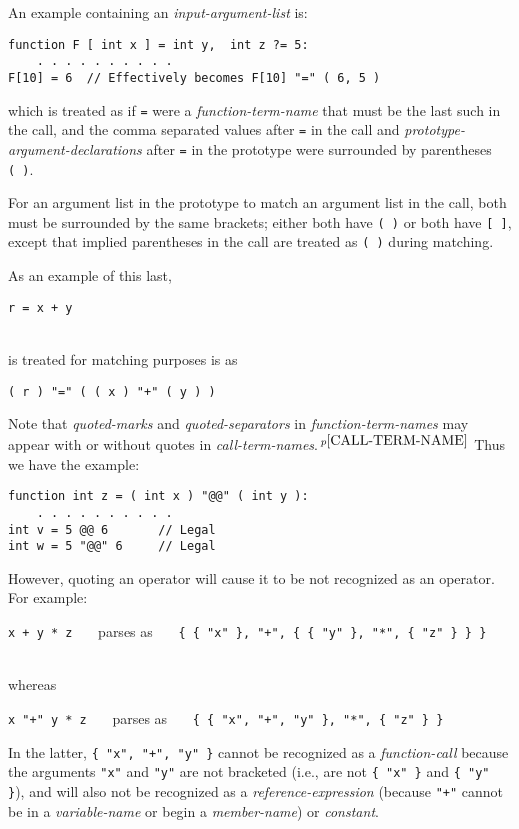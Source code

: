 \documentclass[12pt]{article}
\newcommand{\pagnote}[1]{$\,^{p\pageref{#1}}$}
\newenvironment{indpar}[1][0.3in]%
	{\begin{list}{}%
		     {\setlength{\itemsep}{0in}%
		      \setlength{\topsep}{0in}%
		      \setlength{\parsep}{1ex}%
		      \setlength{\labelwidth}{#1}%
		      \setlength{\leftmargin}{#1}%
		      \addtolength{\leftmargin}{\labelsep}}%
	 \item}%
	{\end{list}}
\begin{document}
An example containing an {\em input-argument-list} is:
\begin{indpar}\begin{verbatim}
function F [ int x ] = int y,  int z ?= 5:
    . . . . . . . . . .
F[10] = 6  // Effectively becomes F[10] "=" ( 6, 5 )
\end{verbatim}\end{indpar}
which is treated as if {\tt =} were a {\em function-term-name}
that must be the last such in the call, and the comma separated
values after {\tt =}
in the call and {\em prototype-argument-declarations} after {\tt =}
in the prototype
were surrounded by parentheses {\tt (~)}.

For an argument
list in the prototype to match an argument list in the call, both
must be surrounded by the same brackets; either both have {\tt (~)}
or both have {\tt [~]}, except that implied parentheses in the
call are treated as {\tt (~)} during matching.

As an example of this last,
\\[0.5ex]
\centerline{
{\tt r = x + y}
}
\\
is treated for matching purposes is as
\\[1ex]
\centerline{
{\tt ( r ) "=" ( ( x ) "+" ( y ) )}
}

Note that {\em quoted-marks} and {\em quoted-separators}
in {\em function-term-names} may appear with or without quotes in
{\em call-term-names}.\pagnote{CALL-TERM-NAME}  Thus we have the example:
\begin{indpar}\begin{verbatim}
function int z = ( int x ) "@@" ( int y ):
    . . . . . . . . . .
int v = 5 @@ 6       // Legal
int w = 5 "@@" 6     // Legal
\end{verbatim}\end{indpar}

However, quoting an operator will cause it to be not recognized as
an operator.  For example:
\\[0.5ex]
\centerline{
{\tt x + y * z}
~~~parses as~~~
{\tt \{ \{ "x" \}, "+", \{ \{ "y" \}, "*", \{ "z" \} \} \}} \\
} \\
whereas \\
\centerline{
{\tt x "+" y * z}
~~~parses as~~~
{\tt \{ \{ "x", "+", "y" \}, "*", \{ "z" \} \}}
}
In the latter, {\tt \{ "x", "+", "y" \}} cannot be recognized as
a {\em function-call} because the arguments {\tt "x"} and {\tt "y"} are
not bracketed (i.e., are not {\tt \{ "x" \}} and {\tt \{ "y" \}}),
and will also not be recognized as a {\em reference-expression}
(because {\tt "+"} cannot be in a {\em variable-name} or
begin a {\em member-name}) or
{\em constant}.
\end{document}
